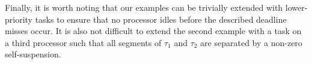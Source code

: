 Finally, it is worth noting that our examples can be trivially extended with lower-priority tasks to ensure that no processor idles before the described deadline misses occur. It is also not difficult to extend the second example with a task on a third processor such that all segments of $\tau_1$ and $\tau_2$ are separated by a non-zero self-suspension.
